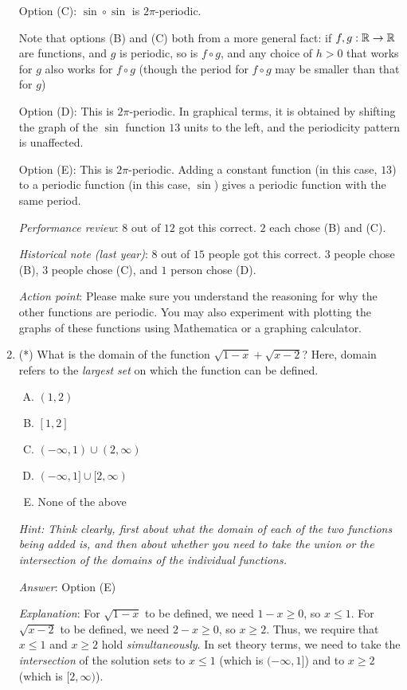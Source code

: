 \documentclass[10pt]{amsart}
\begin{document}
\begin{enumerate}
  Option (C): $\sin \circ \sin$ is $2\pi$-periodic. 

  Note that options (B) and (C) both from a more general fact: if $f,g :\mathbb{R}
  \to \mathbb{R}$ are functions, and $g$ is periodic, so is $f \circ g$, and
  any choice of $h > 0$ that works for $g$ also works for $f \circ g$
  (though the period for $f \circ g$ may be smaller than that for $g$)

  Option (D): This is $2\pi$-periodic. In graphical terms, it is
  obtained by shifting the graph of the $\sin$ function $13$ units to
  the left, and the periodicity pattern is unaffected.

  Option (E): This is $2\pi$-periodic. Adding a constant function (in
  this case, $13$) to a periodic function (in this case, $\sin$) gives
  a periodic function with the same period.

  {\em Performance review}: $8$ out of $12$ got this correct. $2$ each
  chose (B) and (C).

  {\em Historical note (last year)}: $8$ out of $15$ people got this
  correct. $3$ people chose (B), $3$ people chose (C), and $1$ person
  chose (D).

  {\em Action point}: Please make sure you understand the reasoning
  for why the other functions are periodic. You may also experiment
  with plotting the graphs of these functions using Mathematica or a
  graphing calculator.
\item (*) What is the domain of the function $\sqrt{1 - x} + \sqrt{x -
  2}$? Here, domain refers to the {\em largest set} on which the
  function can be defined.

  \begin{enumerate}[(A)]
  \item $(1,2)$
  \item $[1,2]$
  \item $(-\infty,1) \cup (2,\infty)$
  \item $(-\infty,1] \cup [2,\infty)$
  \item None of the above
  \end{enumerate}

  {\em Hint: Think clearly, first about what the domain of each of the
    two functions being added is, and then about whether you need to
    take the union or the intersection of the domains of the
    individual functions.}

  {\em Answer}: Option (E)

  {\em Explanation}: For $\sqrt{1 - x}$ to be defined, we need $1 - x
  \ge 0$, so $x \le 1$. For $\sqrt{x - 2}$ to be defined, we need $2 -
  x \ge 0$, so $x \ge 2$. Thus, we require that $x \le 1$ and $x \ge
  2$ hold {\em simultaneously}. In set theory terms, we need to take
  the {\em intersection} of the solution sets to $x \le 1$ (which is
  $(-\infty,1]$) and to $x \ge 2$ (which is $[2,\infty)$).


\end{enumerate}
\end{document}
